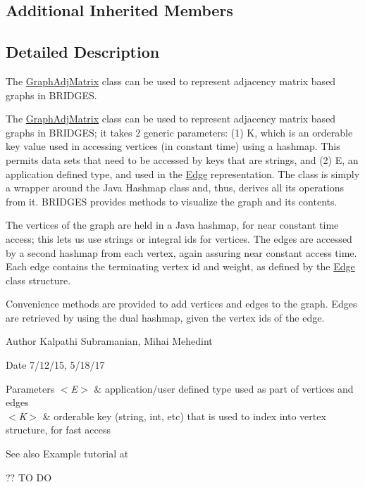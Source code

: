 \subsection*{Additional Inherited Members}


\subsection{Detailed Description}
The \hyperlink{classbridges_1_1base_1_1_graph_adj_matrix}{Graph\+Adj\+Matrix} class can be used to represent adjacency matrix based graphs in B\+R\+I\+D\+G\+ES. 

The \hyperlink{classbridges_1_1base_1_1_graph_adj_matrix}{Graph\+Adj\+Matrix} class can be used to represent adjacency matrix based graphs in B\+R\+I\+D\+G\+ES; it takes 2 generic parameters\+: (1) K, which is an orderable key value used in accessing vertices (in constant time) using a hashmap. This permits data sets that need to be accessed by keys that are strings, and (2) E, an application defined type, and used in the \hyperlink{classbridges_1_1base_1_1_edge}{Edge} representation. The class is simply a wrapper around the Java Hashmap class and, thus, derives all its operations from it. B\+R\+I\+D\+G\+ES provides methods to visualize the graph and its contents.

The vertices of the graph are held in a Java hashmap, for near constant time access; this lets us use strings or integral ids for vertices. The edges are accessed by a second hashmap from each vertex, again assuring near constant access time. Each edge contains the terminating vertex id and weight, as defined by the \hyperlink{classbridges_1_1base_1_1_edge}{Edge} class structure.

Convenience methods are provided to add vertices and edges to the graph. Edges are retrieved by using the dual hashmap, given the vertex ids of the edge.

\begin{DoxyAuthor}{Author}
Kalpathi Subramanian, Mihai Mehedint
\end{DoxyAuthor}
\begin{DoxyDate}{Date}
7/12/15, 5/18/17
\end{DoxyDate}

\begin{DoxyParams}{Parameters}
{\em $<$\+E$>$} & application/user defined type used as part of vertices and edges \\
\hline
{\em $<$\+K$>$} & orderable key (string, int, etc) that is used to index into vertex structure, for fast access\\
\hline
\end{DoxyParams}
\begin{DoxySeeAlso}{See also}
Example tutorial at 
\end{DoxySeeAlso}
?? TO DO 

